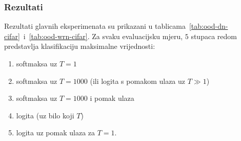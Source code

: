 \documentclass[utf8, diplomski, lmodern]{fer}
\begin{document}
\subsubsection{Rezultati}

Rezultati glavnih eksperimenata su prikazani u tablicama~\ref{tab:ood-dn-cifar}~i~\ref{tab:ood-wrn-cifar}. Za svaku evaluacijsku mjeru, $5$ stupaca redom predstavlja klasifikaciju maksimalne vrijednosti:
\begin{enumerate}[topsep=0pt,itemsep=0pt,partopsep=0pt]
\item softmaksa uz $T=1$
\item softmaksa uz $T=1000$ (ili logita s pomakom ulaza uz $T\gg 1$)
\item softmaksa uz $T=1000$ i pomak ulaza
\item logita (uz bilo koji $T$)
\item logita uz pomak ulaza za $T=1$.
\end{enumerate}
\end{document}
